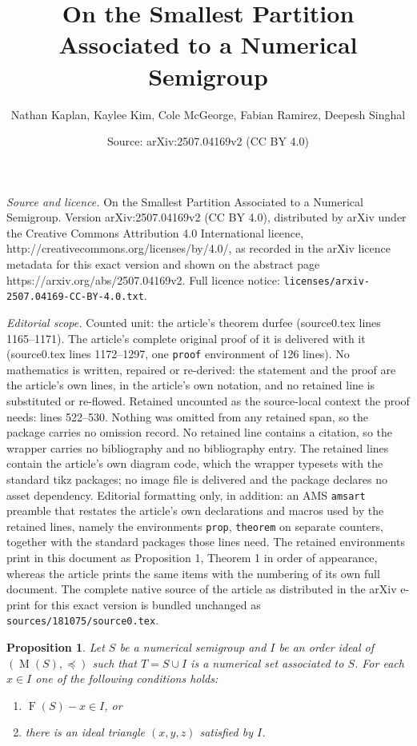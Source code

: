 \documentclass[10pt,a4paper]{amsart}
\title{On the Smallest Partition Associated to a Numerical Semigroup}
\author{Nathan Kaplan, Kaylee Kim, Cole McGeorge, Fabian Ramirez, Deepesh Singhal}
\date{Source: arXiv:2507.04169v2 (CC BY 4.0)}
\newtheorem{prop}{Proposition}
\DeclareMathOperator{\F}{F}
\DeclareMathOperator{\M}{M}
\begin{document}
\maketitle

\noindent\emph{Source and licence.} On the Smallest Partition Associated to a Numerical Semigroup. Version arXiv:2507.04169v2 (CC BY 4.0), distributed by arXiv under the Creative Commons Attribution 4.0 International licence, http://creativecommons.org/licenses/by/4.0/, as recorded in the arXiv licence metadata for this exact version and shown on the abstract page https://arxiv.org/abs/2507.04169v2. Full licence notice: \texttt{licenses/arxiv-2507.04169-CC-BY-4.0.txt}.\par\smallskip

\noindent\textit{Editorial scope.} Counted unit: the article's theorem durfee (source0.tex lines 1165--1171). The article's complete original proof of it is delivered with it (source0.tex lines 1172--1297, one \texttt{proof} environment of 126 lines). No mathematics is written, repaired or re-derived: the statement and the proof are the article's own lines, in the article's own notation, and no retained line is substituted or re-flowed.  Retained uncounted as the source-local context the proof needs: lines 522--530.  Nothing was omitted from any retained span, so the package carries no omission record.  No retained line contains a citation, so the wrapper carries no bibliography and no bibliography entry.  The retained lines contain the article's own diagram code, which the wrapper typesets with the standard tikz packages; no image file is delivered and the package declares no asset dependency.  Editorial formatting only, in addition: an AMS \texttt{amsart} preamble that restates the article's own declarations and macros used by the retained lines, namely the environments \texttt{prop}, \texttt{theorem} on separate counters, together with the standard packages those lines need.  The retained environments print in this document as Proposition 1, Theorem 1 in order of appearance, whereas the article prints the same items with the numbering of its own full document.  The complete native source of the article as distributed in the arXiv e-print for this exact version is bundled unchanged as \texttt{sources/181075/source0.tex}.
\begin{prop}
    \label{Element in I}
    Let $S$ be a numerical semigroup and $I$ be an order ideal of $(\M(S),\preccurlyeq)$ such that $T = S\cup I$ is a numerical set associated to $S$. 
For each $x \in I$ one of the following conditions holds:
    \begin{enumerate}
        \item $\F(S)-x\in I$, or
        \item there is an ideal triangle $(x,y,z)$ satisfied by $I$.
    \end{enumerate}
\end{prop}
\end{document}
